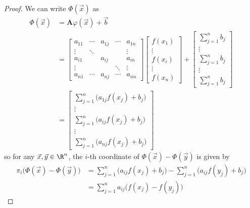 \documentclass[12pt,letterpaper]{article}
\begin{document}
\begin{enumerate}
\begin{proof}
We can write $\Phi(\vec{x})$ as 
\begin{align*}
\Phi(\vec{x})&=\mathbf{A}\varphi(\vec{x})+\vec{b}\\
&=
	\left[
	\begin{array}{ccccc}
	a_{11} & \cdots & a_{1j} & \cdots & a_{1n} \\
	\vdots & \ddots &        &        & \vdots \\
	a_{i1} &        & a_{ij} &        & a_{in} \\
	\vdots &        &        & \ddots & \vdots \\
	a_{n1} & \cdots & a_{nj} & \cdots & a_{nn} 
	\end{array}
	\right]
%
	\left[
	\begin{array}{c}
	f(x_1) \\
	\vdots \\
	f(x_i) \\
	\vdots \\
	f(x_n) 
	\end{array}
	\right]
+
	\left[
	\begin{array}{c}
	\sum_{j=1}^n b_j \\
	\vdots \\
	\sum_{j=1}^n b_j \\
	\vdots \\
	\sum_{j=1}^n b_j 
	\end{array}
	\right]
\\
&=
	\left[
	\begin{array}{c}
	\sum_{j=1}^n \big(a_{1j}f(x_j)+b_j\big) \\
	\vdots \\
	\sum_{j=1}^n \big(a_{ij}f(x_j)+b_j\big) \\
	\vdots \\
	\sum_{j=1}^n \big(a_{nj}f(x_j)+b_j\big) 
	\end{array}
	\right]
\end{align*}
so for any $\vec{x},\vec{y}\in\R^n$, the $i$-th coordinate of $\Phi(\vec{x})-\Phi(\vec{y})$ is given by 
\begin{align*}
\pi_i\big(\Phi(\vec{x})-\Phi(\vec{y})\big)
&= 
	\sum_{j=1}^n \big(a_{ij}f(x_j)+b_j\big) 
	-
	\sum_{j=1}^n \big(a_{ij}f(y_j)+b_j\big) 
\\&=  \sum_{j=1}^n a_{ij}\big(f(x_j) -	f(y_j)\big)
\end{align*}

\end{proof}
\end{enumerate}
\end{document}
